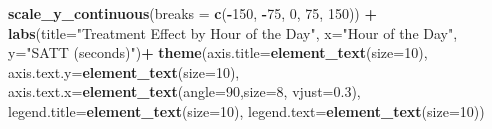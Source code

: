 \documentclass[
  12pt,
]{article}
\newenvironment{Shaded}{\begin{snugshade}}{\end{snugshade}}
\newcommand{\AttributeTok}[1]{\textcolor[rgb]{0.13,0.29,0.53}{#1}}
\newcommand{\DecValTok}[1]{\textcolor[rgb]{0.00,0.00,0.81}{#1}}
\newcommand{\FloatTok}[1]{\textcolor[rgb]{0.00,0.00,0.81}{#1}}
\newcommand{\FunctionTok}[1]{\textcolor[rgb]{0.13,0.29,0.53}{\textbf{#1}}}
\newcommand{\NormalTok}[1]{#1}
\newcommand{\SpecialCharTok}[1]{\textcolor[rgb]{0.81,0.36,0.00}{\textbf{#1}}}
\newcommand{\StringTok}[1]{\textcolor[rgb]{0.31,0.60,0.02}{#1}}
\begin{document}
\begin{Shaded}
\begin{Highlighting}[]
  \FunctionTok{scale\_y\_continuous}\NormalTok{(}\AttributeTok{breaks =} \FunctionTok{c}\NormalTok{(}\SpecialCharTok{{-}}\DecValTok{150}\NormalTok{, }\SpecialCharTok{{-}}\DecValTok{75}\NormalTok{, }\DecValTok{0}\NormalTok{, }\DecValTok{75}\NormalTok{, }\DecValTok{150}\NormalTok{)) }\SpecialCharTok{+}
  \FunctionTok{labs}\NormalTok{(}\AttributeTok{title=}\StringTok{"Treatment Effect by Hour of the Day"}\NormalTok{,}
       \AttributeTok{x=}\StringTok{"Hour of the Day"}\NormalTok{,}
       \AttributeTok{y=}\StringTok{"SATT (seconds)"}\NormalTok{)}\SpecialCharTok{+}
  \FunctionTok{theme}\NormalTok{(}\AttributeTok{axis.title=}\FunctionTok{element\_text}\NormalTok{(}\AttributeTok{size=}\DecValTok{10}\NormalTok{),}
        \AttributeTok{axis.text.y=}\FunctionTok{element\_text}\NormalTok{(}\AttributeTok{size=}\DecValTok{10}\NormalTok{),}
        \AttributeTok{axis.text.x=}\FunctionTok{element\_text}\NormalTok{(}\AttributeTok{angle=}\DecValTok{90}\NormalTok{,}\AttributeTok{size=}\DecValTok{8}\NormalTok{, }\AttributeTok{vjust=}\FloatTok{0.3}\NormalTok{),}
        \AttributeTok{legend.title=}\FunctionTok{element\_text}\NormalTok{(}\AttributeTok{size=}\DecValTok{10}\NormalTok{),}
        \AttributeTok{legend.text=}\FunctionTok{element\_text}\NormalTok{(}\AttributeTok{size=}\DecValTok{10}\NormalTok{))}
\end{Highlighting}
\end{Shaded}
\end{document}
